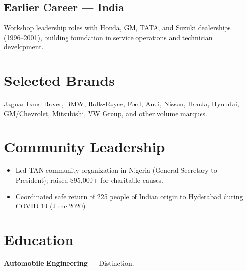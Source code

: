 \documentclass[11pt,letterpaper]{article}
\begin{document}
\vspace{0.35em}
\subsection*{\color{accent}Earlier Career --- India}
Workshop leadership roles with Honda, GM, TATA, and Suzuki dealerships (1996--2001), building foundation in service operations and technician development.

\section{Selected Brands}
Jaguar Land Rover, BMW, Rolls-Royce, Ford, Audi, Nissan, Honda, Hyundai, GM/Chevrolet, Mitsubishi, VW Group, and other volume marques.

\section{Community Leadership}
\begin{itemize}
  \item Led TAN community organization in Nigeria (General Secretary to President); raised \$95{,}000+ for charitable causes.
  \item Coordinated safe return of 225 people of Indian origin to Hyderabad during COVID-19 (June 2020).
\end{itemize}

\section{Education}
\textbf{Automobile Engineering} --- Distinction.
\end{document}
